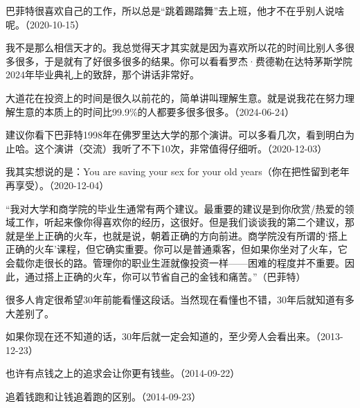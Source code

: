 巴菲特很喜欢自己的工作，所以总是“跳着踢踏舞”去上班，他才不在乎别人说啥呢。（2020-10-15）


我不是那么相信天才的。我总觉得天才其实就是因为喜欢所以花的时间比别人多很多很多，于是就有了好很多很多的结果。你可以看看罗杰·费德勒在达特茅斯学院2024年毕业典礼上的致辞，那个讲话非常好。


大道花在投资上的时间是很久以前花的，简单讲叫理解生意。就是说我花在努力理解生意的本质上的时间比99.9\%的人都要多很多很多。（2024-06-24）


建议你看下巴菲特1998年在佛罗里达大学的那个演讲。可以多看几次，看到明白为止哈。这个演讲（交流）我听了不下10次，非常值得仔细听。（2020-12-03）

我其实想说的是：You are saving your sex for your old years（你在把性留到老年再享受）。（2020-12-04）

“我对大学和商学院的毕业生通常有两个建议。最重要的建议是到你欣赏/热爱的领域工作，听起来像你得喜欢你的经历，这很好。但是我们谈谈我的第二个建议，那就是坐上正确的火车，也就是说，朝着正确的方向前进。商学院没有所谓的‘搭上正确的火车’课程，但它确实重要。你可以是普通乘客，但如果你坐对了火车，它会载你走很长的路。管理你的职业生涯就像投资一样——困难的程度并不重要。因此，通过搭上正确的火车，你可以节省自己的金钱和痛苦。”（巴菲特）

很多人肯定很希望30年前能看懂这段话。当然现在看懂也不错，30年后就知道有多大差别了。


如果你现在还不知道的话，30年后就一定会知道的，至少旁人会看出来。（2013-12-23）


也许有点钱之上的追求会让你更有钱些。（2014-09-22）


追着钱跑和让钱追着跑的区别。（2014-09-23）

